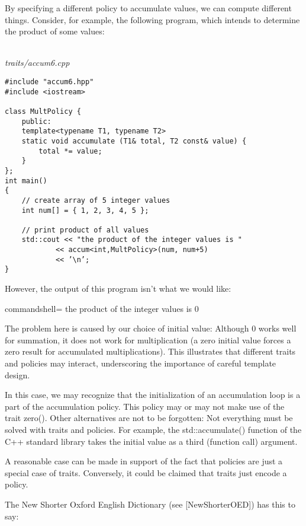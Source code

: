 By specifying a different policy to accumulate values, we can compute different things. Consider, for example, the following program, which intends to determine the product of some values:

\hspace*{\fill} \\ %
\noindent
\textit{traits/accum6.cpp}
\begin{lstlisting}[style=styleCXX]
#include "accum6.hpp"
#include <iostream>

class MultPolicy {
	public:
	template<typename T1, typename T2>
	static void accumulate (T1& total, T2 const& value) {
		total *= value;
	}
};
int main()
{
	// create array of 5 integer values
	int num[] = { 1, 2, 3, 4, 5 };
	
	// print product of all values
	std::cout << "the product of the integer values is "
			<< accum<int,MultPolicy>(num, num+5)
			<< ’\n’;
}
\end{lstlisting}

However, the output of this program isn’t what we would like:

\begin{tcblisting}{commandshell={}}
the product of the integer values is 0
\end{tcblisting}

The problem here is caused by our choice of initial value: Although 0 works well for summation, it does not work for multiplication (a zero initial value forces a zero result for accumulated multiplications). This illustrates that different traits and policies may interact, underscoring the importance of careful template design.

In this case, we may recognize that the initialization of an accumulation loop is a part of the accumulation policy. This policy may or may not make use of the trait zero(). Other alternatives are not to be forgotten: Not everything must be solved with traits and policies. For example, the std::accumulate() function of the C++ standard library takes the initial value as a third (function call) argument.



A reasonable case can be made in support of the fact that policies are just a special case of traits. Conversely, it could be claimed that traits just encode a policy.

The New Shorter Oxford English Dictionary (see [NewShorterOED]) has this to say:

